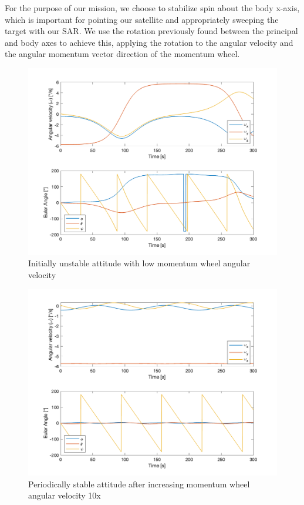 For the purpose of our mission, we choose to stabilize spin about the body x-axis, which is important for pointing our satellite and appropriately sweeping the target with our SAR. We use the rotation previously found between the principal and body axes to achieve this, applying the rotation to the angular velocity and the angular momentum vector direction of the momentum wheel.

\begin{figure}[H]
\centering
\includegraphics[scale=0.6]{Images/ps4_problem3e_unstable.png}
\caption{Initially unstable attitude with low momentum wheel angular velocity}
\label{fig:ps4_problem3e_unstable.png}
\end{figure}

\begin{figure}[H]
\centering
\includegraphics[scale=0.6]{Images/ps4_problem3e_stable.png}
\caption{Periodically stable attitude after increasing momentum wheel angular velocity 10x}
\label{fig:ps4_problem3e_stable.png}
\end{figure}